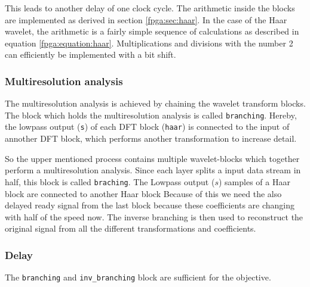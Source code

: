 \begin{refsection}
This leads to another delay of one clock cycle.
The arithmetic inside the blocks are implemented as derived in section \ref{fpga:sec:haar}.
In the case of the Haar wavelet, the arithmetic is a fairly simple sequence of calculations as  described in equation \ref{fpga:equation:haar}.
Multiplications and divisions with the number 2 can efficiently be implemented with a bit shift.


\subsubsection{Multiresolution analysis}

The multiresolution analysis is achieved by chaining the wavelet transform blocks.
The block which holds the multiresolution analysis is called \texttt{branching}.
Hereby, the lowpass output (\texttt{s}) of each DFT block (\texttt{haar}) is connected to the input of annother DFT block, which performs another transformation to increase detail. 


So the upper mentioned process contains multiple wavelet-blocks which together perform a multiresolution analysis.
Since each layer splits a input data stream in half, this block is called \texttt{braching}.
The Lowpass output ($s$) samples of a Haar block are connected to another Haar block 
Because of this we need the also delayed ready signal from the last block because these coefficients are changing with half of the speed now. 
The inverse branching is then used to reconstruct the original signal from all the different transformations and coefficients.


\subsubsection{Delay}

The \texttt{branching} and \texttt{inv\_branching} block are sufficient for the objective. %


\end{refsection}
